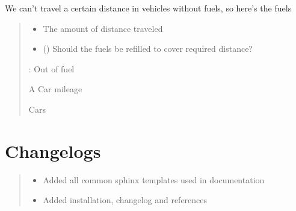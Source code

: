 \documentclass[letterpaper,10pt,english]{sphinxmanual}
\begin{document}
\begin{fulllineitems}
\begin{fulllineitems}
\label{\detokenize{_autosummary/module.submodule.dummycode.SphinxVehicle:module.submodule.dummycode.SphinxVehicle.cars}}
\pysigstartsignatures
{}
\pysigstopsignatures
\sphinxAtStartPar
We can’t travel a certain distance in vehicles without fuels, so here’s the fuels
\begin{quote}\begin{description}
\begin{itemize}
\item {} 
\sphinxAtStartPar
{} \textendash{} The amount of distance traveled

\item {} 
\sphinxAtStartPar
{} () \textendash{} Should the fuels be refilled to cover required distance?

\end{itemize}

\sphinxAtStartPar
{}: Out of fuel

\sphinxAtStartPar
A Car mileage

\sphinxAtStartPar
Cars

\end{description}\end{quote}

\end{fulllineitems}


\end{fulllineitems}


\sphinxstepscope


\chapter{Changelogs}
\label{\detokenize{changelogs:changelogs}}\label{\detokenize{changelogs::doc}}\begin{quote}\begin{description}
\begin{description}
\begin{itemize}
\item {} 
\sphinxAtStartPar
Added all common sphinx templates used in documentation

\item {} 
\sphinxAtStartPar
Added installation, changelog and references

\end{itemize}

\end{description}

\end{description}\end{quote}
\end{document}
